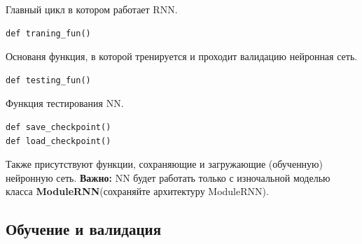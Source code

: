 \documentclass[a4paper,11pt]{article} %
\begin{document}
Главный цикл в котором работает RNN.

\begin{lstlisting}
def traning_fun()
\end{lstlisting}

Основаня функция, в которой тренируется и проходит валидацию нейронная сеть.

\begin{lstlisting}
def testing_fun()
\end{lstlisting}

Функция тестирования NN.

\begin{lstlisting}
def save_checkpoint()
def load_checkpoint()
\end{lstlisting}

 Также присутствуют функции,  сохраняющие и загружающие (обученную) нейронную сеть. \textbf{Важно:}  NN  будет работать только с изночальной моделью класса \textbf{ModuleRNN}(сохраняйте архитектуру ModuleRNN).
 
\subsection{Обучение и валидация}\label{trainval}
\end{document}
